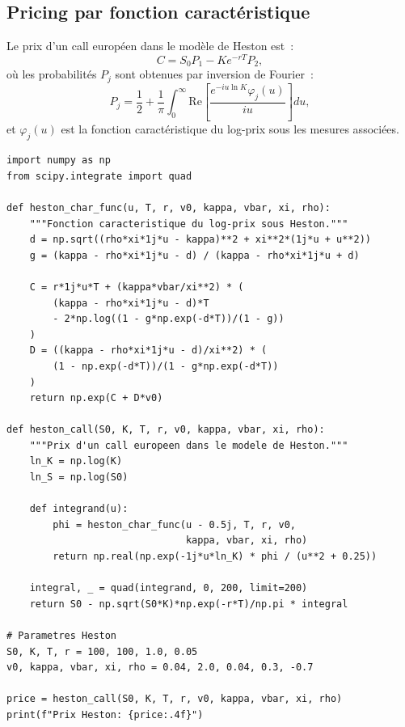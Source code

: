 \subsection{Pricing par fonction caract\'eristique}

\begin{theoreme}
Le prix d'un call europ\'een dans le mod\`ele de Heston est~:
\[
    C = S_0 P_1 - Ke^{-rT}P_2,
\]
o\`u les probabilit\'es $P_j$ sont obtenues par inversion de Fourier~:
\[
    P_j = \frac{1}{2} + \frac{1}{\pi}\int_0^\infty
    \text{Re}\!\left[\frac{e^{-iu\ln K}\varphi_j(u)}{iu}\right]du,
\]
et $\varphi_j(u)$ est la fonction caract\'eristique du log-prix sous
les mesures associ\'ees.
\end{theoreme}

\begin{codeblock}[title=\textbf{Pricing Heston par transform\'ee de Fourier}]
\begin{verbatim}
import numpy as np
from scipy.integrate import quad

def heston_char_func(u, T, r, v0, kappa, vbar, xi, rho):
    """Fonction caracteristique du log-prix sous Heston."""
    d = np.sqrt((rho*xi*1j*u - kappa)**2 + xi**2*(1j*u + u**2))
    g = (kappa - rho*xi*1j*u - d) / (kappa - rho*xi*1j*u + d)

    C = r*1j*u*T + (kappa*vbar/xi**2) * (
        (kappa - rho*xi*1j*u - d)*T
        - 2*np.log((1 - g*np.exp(-d*T))/(1 - g))
    )
    D = ((kappa - rho*xi*1j*u - d)/xi**2) * (
        (1 - np.exp(-d*T))/(1 - g*np.exp(-d*T))
    )
    return np.exp(C + D*v0)

def heston_call(S0, K, T, r, v0, kappa, vbar, xi, rho):
    """Prix d'un call europeen dans le modele de Heston."""
    ln_K = np.log(K)
    ln_S = np.log(S0)

    def integrand(u):
        phi = heston_char_func(u - 0.5j, T, r, v0,
                               kappa, vbar, xi, rho)
        return np.real(np.exp(-1j*u*ln_K) * phi / (u**2 + 0.25))

    integral, _ = quad(integrand, 0, 200, limit=200)
    return S0 - np.sqrt(S0*K)*np.exp(-r*T)/np.pi * integral

# Parametres Heston
S0, K, T, r = 100, 100, 1.0, 0.05
v0, kappa, vbar, xi, rho = 0.04, 2.0, 0.04, 0.3, -0.7

price = heston_call(S0, K, T, r, v0, kappa, vbar, xi, rho)
print(f"Prix Heston: {price:.4f}")
\end{verbatim}
\end{codeblock}

